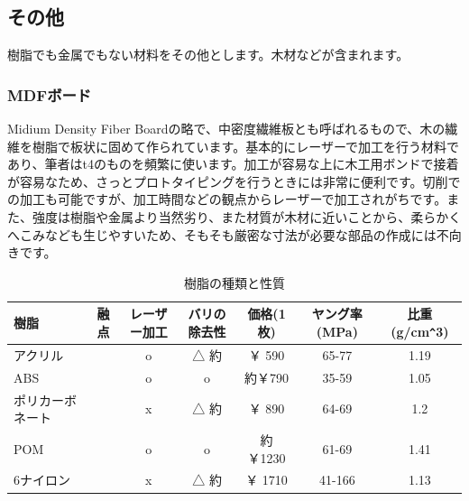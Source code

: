 \documentclass[b5paper, 9pt, twocolumn, titlepage,openany]{jsbook}%
\begin{document}
\subsection{その他}

樹脂でも金属でもない材料をその他とします。木材などが含まれます。\\
\subsubsection{MDFボード}

Midium Density Fiber Boardの略で、中密度繊維板とも呼ばれるもので、木の繊維を樹脂で板状に固めて作られています。基本的にレーザーで加工を行う材料であり、筆者はt4のものを頻繁に使います。加工が容易な上に木工用ボンドで接着が容易なため、さっとプロトタイピングを行うときには非常に便利です。切削での加工も可能ですが、加工時間などの観点からレーザーで加工されがちです。また、強度は樹脂や金属より当然劣り、また材質が木材に近いことから、柔らかくへこみなども生じやすいため、そもそも厳密な寸法が必要な部品の作成には不向きです。\\

\clearpage
\begin{table}[htb]
  \begin{center}
    \begin{tabular}{|l|c|c|c|c|c|c|} \hline
      樹脂 & 融点 & レーザー加工 & バリの除去性  & 価格(1枚) & ヤング率(MPa) & 比重(g/cm\verb|^|3)\\ \hline
      アクリル        & & o & △  約&￥ 590   &65-77  & 1.19 \\ \hline
      ABS             & & o & o  &約￥790  & 35-59  & 1.05\\ \hline
      ポリカーボネート& & x & △  約&￥ 890   &64-69  & 1.2 \\ \hline
      POM             & & o & o  &約￥1230 & 61-69  & 1.41\\ \hline
      6ナイロン       & & x & △  約&￥ 1710  &41-166  &1.13 \\ \hline
    \end{tabular}
    \caption{樹脂の種類と性質    \label{plastic_table}}
  \end{center}
\end{table}
\end{document}
